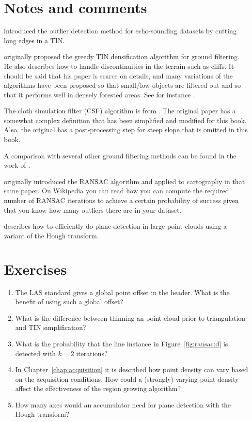 %
\section{Notes and comments}

\citet{Arge10} introduced the outlier detection method for echo-sounding datasets by cutting long edges in a TIN\@.

\citet{Axelsson00} originally proposed the greedy TIN densification algorithm for ground filtering.
He also describes how to handle discontinuities in the terrain such as cliffs.
It should be said that his paper is scarce on details, and many variations of the algorithms have been proposed so that small/low objects are filtered out and so that it performs well in densely forested areas.
See for instance \citet{Lin14}. 

The cloth simulation filter (CSF) algorithm is from \citet{Zhang16}.
The original paper has a somewhat complex definition that has been simplified and modified for this book.
Also, the original has a post-processing step for steep slope that is omitted in this book.

A comparison with several other ground filtering methods can be found in the work of \citet{Meng10}.

\citet{Fischler81} originally introduced the RANSAC algorithm and applied to cartography in that same paper. On Wikipedia you can read how you can compute the required number of RANSAC iterations to achieve a certain probability of success given that you know how many outliers there are in your dataset.

\citet{Limberger15} describes how to efficiently do plane detection in large point clouds using a variant of the Hough transform.

%
\section{Exercises}


\begin{enumerate}
   \item The LAS standard gives a global point offset in the header. What is the benefit of using such a global offset?  
   \item What is the difference between thinning an point cloud prior to triangulation and TIN simplification?
  \item What is the probability that the line instance in Figure~\ref{fig:ransac:d} is detected with $k=2$ iterations?
  \item In Chapter~\ref{chap:acquisition} it is described how point density can vary based on the acquisition conditions. How could a (strongly) varying point density affect the effectiveness of the region growing algorithm?
  \item How many axes would an accumulator need for plane detection with the Hough transform?

\end{enumerate}
